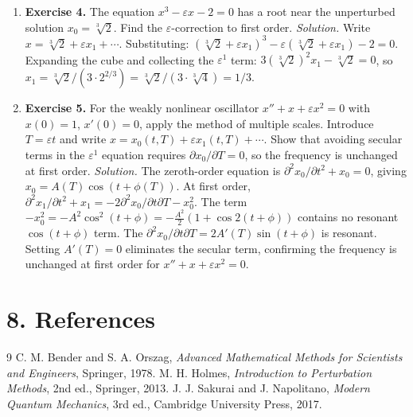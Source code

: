 \begin{enumerate}[leftmargin=*,itemsep=0.9em]
\item \textbf{Exercise 4.} The equation $x^3-\varepsilon x-2=0$ has a root near the unperturbed solution $x_0=\sqrt[3]{2}$. Find the $\varepsilon$-correction to first order. \emph{Solution.} Write $x=\sqrt[3]{2}+\varepsilon x_1+\cdots$. Substituting: $(\sqrt[3]{2}+\varepsilon x_1)^3-\varepsilon(\sqrt[3]{2}+\varepsilon x_1)-2=0$. Expanding the cube and collecting the $\varepsilon^1$ term: $3(\sqrt[3]{2})^2 x_1-\sqrt[3]{2}=0$, so $x_1=\sqrt[3]{2}/(3\cdot 2^{2/3})=\sqrt[3]{2}/(3\cdot\sqrt[3]{4})=1/3$.

\item \textbf{Exercise 5.} For the weakly nonlinear oscillator $x''+x+\varepsilon x^2=0$ with $x(0)=1$, $x'(0)=0$, apply the method of multiple scales. Introduce $T=\varepsilon t$ and write $x=x_0(t,T)+\varepsilon x_1(t,T)+\cdots$. Show that avoiding secular terms in the $\varepsilon^1$ equation requires $\partial x_0/\partial T=0$, so the frequency is unchanged at first order. \emph{Solution.} The zeroth-order equation is $\partial^2 x_0/\partial t^2+x_0=0$, giving $x_0=A(T)\cos(t+\phi(T))$. At first order, $\partial^2 x_1/\partial t^2+x_1=-2\partial^2 x_0/\partial t\partial T-x_0^2$. The term $-x_0^2=-A^2\cos^2(t+\phi)=-\frac{A^2}{2}(1+\cos 2(t+\phi))$ contains no resonant $\cos(t+\phi)$ term. The $\partial^2 x_0/\partial t\partial T=2A'(T)\sin(t+\phi)$ is resonant. Setting $A'(T)=0$ eliminates the secular term, confirming the frequency is unchanged at first order for $x''+x+\varepsilon x^2=0$.

\end{enumerate}
\section*{8. References}
\begin{thebibliography}{9}
 C. M. Bender and S. A. Orszag, \emph{Advanced Mathematical Methods for Scientists and Engineers}, Springer, 1978.
 M. H. Holmes, \emph{Introduction to Perturbation Methods}, 2nd ed., Springer, 2013.
 J. J. Sakurai and J. Napolitano, \emph{Modern Quantum Mechanics}, 3rd ed., Cambridge University Press, 2017.
\end{thebibliography}
